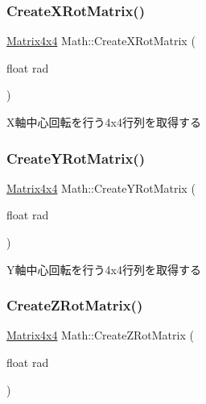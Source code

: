 \mbox{\label{namespace_math_ac4e4a920c3ea9b1afefe04ed2d4e3b34}} 
\subsubsection{\texorpdfstring{Create\+X\+Rot\+Matrix()}{CreateXRotMatrix()}}
{\footnotesize\ttfamily \mbox{\hyperlink{struct_math_1_1_matrix4x4}{Matrix4x4}} Math\+::\+Create\+X\+Rot\+Matrix (\begin{DoxyParamCaption}\item[{float}]{rad }\end{DoxyParamCaption})}



X軸中心回転を行う4x4行列を取得する 

\mbox{\label{namespace_math_a82079192513df361d5828e6a8c8754f3}} 
\subsubsection{\texorpdfstring{Create\+Y\+Rot\+Matrix()}{CreateYRotMatrix()}}
{\footnotesize\ttfamily \mbox{\hyperlink{struct_math_1_1_matrix4x4}{Matrix4x4}} Math\+::\+Create\+Y\+Rot\+Matrix (\begin{DoxyParamCaption}\item[{float}]{rad }\end{DoxyParamCaption})}



Y軸中心回転を行う4x4行列を取得する 

\mbox{\label{namespace_math_a359a2e7263fd64b49264e158052107ab}} 
\subsubsection{\texorpdfstring{Create\+Z\+Rot\+Matrix()}{CreateZRotMatrix()}}
{\footnotesize\ttfamily \mbox{\hyperlink{struct_math_1_1_matrix4x4}{Matrix4x4}} Math\+::\+Create\+Z\+Rot\+Matrix (\begin{DoxyParamCaption}\item[{float}]{rad }\end{DoxyParamCaption})}




